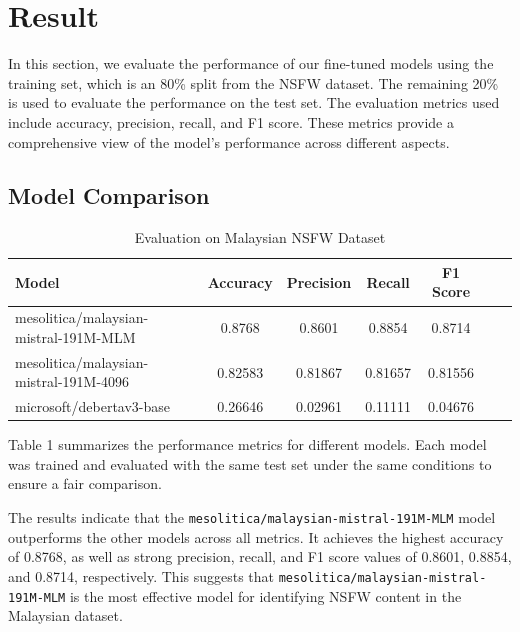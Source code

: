\documentclass[preprint]{article}
\begin{document}
\section{Result}

In this section, we evaluate the performance of our fine-tuned models using the training set, which is an 80\% split from the NSFW dataset. The remaining 20\% is used to evaluate the performance on the test set. The evaluation metrics used include accuracy, precision, recall, and F1 score. These metrics provide a comprehensive view of the model's performance across different aspects.

\subsection{Model Comparison}

\begin{table}[h]
  \centering
  \caption{Evaluation on Malaysian NSFW Dataset}
  \label{tab:model_comparison}
  \begin{tabular}{lcccccc}
    \hline
    \textbf{Model}                         & \textbf{Accuracy} & \textbf{Precision} & \textbf{Recall} & \textbf{F1 Score} \\
    \hline
    mesolitica/malaysian-mistral-191M-MLM  & 0.8768            & 0.8601             & 0.8854          & 0.8714            \\
    mesolitica/malaysian-mistral-191M-4096 & 0.82583           & 0.81867            & 0.81657         & 0.81556           \\
    microsoft/debertav3-base               & 0.26646           & 0.02961            & 0.11111         & 0.04676           \\
    \hline
  \end{tabular}
\end{table}

Table 1 summarizes the performance metrics for different models. Each model was trained and evaluated with the same test set under the same conditions to ensure a fair comparison.

The results indicate that the \texttt{mesolitica/malaysian-mistral-191M-MLM} model outperforms the other models across all metrics. It achieves the highest accuracy of 0.8768, as well as strong precision, recall, and F1 score values of 0.8601, 0.8854, and 0.8714, respectively. This suggests that \texttt{mesolitica/malaysian-mistral-191M-MLM} is the most effective model for identifying NSFW content in the Malaysian dataset.
\end{document}
